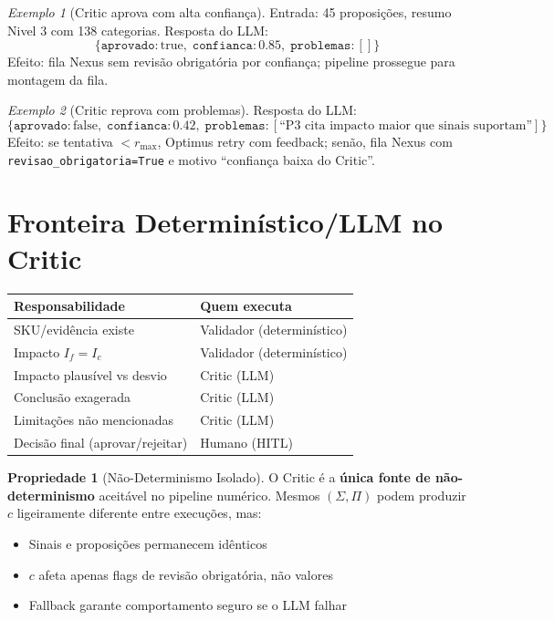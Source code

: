 \documentclass[a4paper, 12pt]{report}
\theoremstyle{definition}
\newtheorem{propriedade}{Propriedade}[chapter]
\theoremstyle{remark}
\newtheorem{exemplo}{Exemplo}[chapter]
\begin{document}
\begin{exemplo}[Critic aprova com alta confian\c{c}a]
  Entrada: 45 proposi\c{c}\~oes, resumo Nivel 3 com 138 categorias.
  Resposta do LLM:
  \[
    \{\texttt{aprovado}: \text{true},\;
    \texttt{confianca}: 0.85,\;
    \texttt{problemas}: []\}
  \]
  Efeito: fila Nexus sem revis\~ao obrigat\'oria por confian\c{c}a;
  pipeline prossegue para montagem da fila.
\end{exemplo}

\begin{exemplo}[Critic reprova com problemas]
  Resposta do LLM:
  \[
    \{\texttt{aprovado}: \text{false},\;
    \texttt{confianca}: 0.42,\;
    \texttt{problemas}: [\text{``P3 cita impacto maior que sinais suportam''}]\}
  \]
  Efeito: se tentativa $< r_{\max}$, Optimus retry com feedback;
  sen\~ao, fila Nexus com \texttt{revisao\_obrigatoria=True} e
  motivo ``confian\c{c}a baixa do Critic''.
\end{exemplo}


\section{Fronteira Determin\'istico/LLM no Critic}

\begin{center}
\begin{tabular}{ll}
  \toprule
  \textbf{Responsabilidade} & \textbf{Quem executa} \\
  \midrule
  SKU/evid\^encia existe & Validador (determin\'istico) \\
  Impacto $I_f = I_c$ & Validador (determin\'istico) \\
  Impacto plaus\'ivel vs desvio & Critic (LLM) \\
  Conclus\~ao exagerada & Critic (LLM) \\
  Limita\c{c}\~oes n\~ao mencionadas & Critic (LLM) \\
  Decis\~ao final (aprovar/rejeitar) & Humano (HITL) \\
  \bottomrule
\end{tabular}
\end{center}

\begin{propriedade}[N\~ao-Determinismo Isolado]
  O Critic \'e a \textbf{\'unica fonte de n\~ao-determinismo} aceit\'avel
  no pipeline num\'erico. Mesmos $(\Sigma, \Pi)$ podem produzir
  $c$ ligeiramente diferente entre execu\c{c}\~oes, mas:
  \begin{itemize}
    \item Sinais e proposi\c{c}\~oes permanecem id\^enticos
    \item $c$ afeta apenas flags de revis\~ao obrigat\'oria, n\~ao valores
    \item Fallback garante comportamento seguro se o LLM falhar
  \end{itemize}
\end{propriedade}
\end{document}
